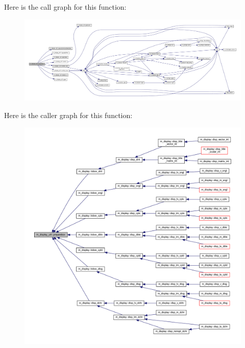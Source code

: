 Here is the call graph for this function\+:
\nopagebreak
\begin{figure}[H]
\begin{center}
\leavevmode
\includegraphics[width=350pt]{namespacem__display__util_a70f3818ca97ec91537e81b9f9b10953c_cgraph}
\end{center}
\end{figure}
Here is the caller graph for this function\+:
\nopagebreak
\begin{figure}[H]
\begin{center}
\leavevmode
\includegraphics[width=350pt]{namespacem__display__util_a70f3818ca97ec91537e81b9f9b10953c_icgraph}
\end{center}
\end{figure}
\mbox{\label{namespacem__display__util_a73ae4e30d2dcf1f608ac24bf1623ee6c}} 
